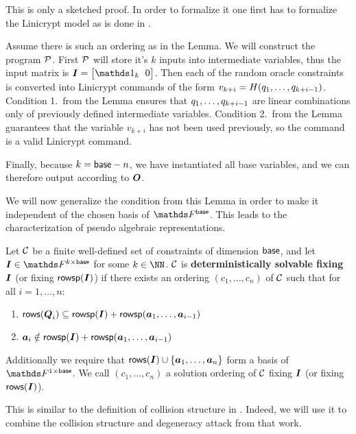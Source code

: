 \begin{sketch}
    This is only a sketched proof.
    In order to formalize it one first has to formalize the Linicrypt model as is done in \cite{C:CarRos16}.

    Assume there is such an ordering as in the Lemma.
    We will construct the program $\P$.
    First $\P$ will store it's $k$ inputs into intermediate variables,
    thus the input matrix is $\I = \m{\Id_k & 0}$.
    Then each of the random oracle constraints is converted into Linicrypt commands of the form
    $v_{k+i} = H(\dts q {k+i-1})$.
    Condition 1.~from the Lemma ensures that $\dts q {k+i-1}$ are linear combinations only of previously defined intermediate variables.  
    Condition 2.~from the Lemma guarantees that the variable $v_{k+i}$ has not been used previously,
    so the command is a valid Linicrypt command.
    
    Finally, because $k=\base - n$, we have instantiated all base variables,
    and we can therefore output according to $\O$.
\end{sketch}

We will now generalize the condition from this Lemma in order to make it independent of the chosen basis of $\Fsp$.
This leads to the characterization of pseudo algebraic representations.

\begin{defn}
\label{def_det_solvable}
    Let $\C$ be a finite well-defined set of constraints of dimension $\base$,
    and let $\I \in \F^{k \times \base}$ for some $k \in \NN$.
    $\C$ is \textbf{deterministically solvable fixing} $\I$ (or fixing $\rowsp(\I)$)
    if there exists an ordering $(c_1, \dots, c_n)$ of $\C$
    such that for all $i=1, \dots, n$:
    \begin{enumerate}
    \item
        \label{solvable1}
        $\rows(\Q_i) \subseteq \rowsp(\I) + \rowsp(\va_1, \dots, \va_{i-1})$
    \item
        \label{solvable2}
        $\va_i \notin \rowsp(\I) + \rowsp(\va_1, \dots, \va_{i-1})$
    \end{enumerate}
    Additionally we require that $\rows(\I) \cup \{\va_1, \dots, \va_n\}$ form a basis of $\F^{1\times\base}$.
    We call $(c_1, \dots, c_n)$ a solution ordering of $\C$ fixing $\I$ (or fixing $\rows(\I)$).
\end{defn}

This is similar to the definition of collision structure in \cite{TCC:McQSwoRos19}.
Indeed, we will use it to combine the collision structure and degeneracy attack from that work.

